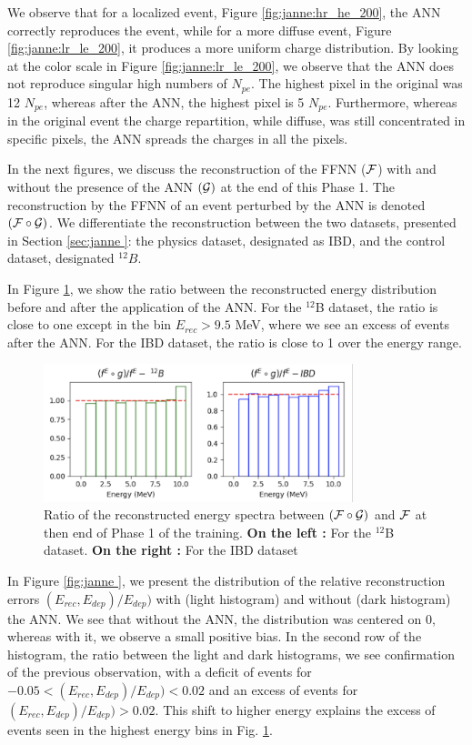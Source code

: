 \documentclass[../main.tex]{subfiles}
\begin{document}
We observe that for a localized event, Figure \ref{fig:janne:hr_he_200}, the ANN correctly reproduces the event, while for a more diffuse event, Figure \ref{fig:janne:lr_le_200}, it produces a more uniform charge distribution. By looking at the color scale in Figure \ref{fig:janne:lr_le_200}, we observe that the ANN does not reproduce singular high numbers of $N_{pe}$. The highest pixel in the original was 12 $N_{pe}$, whereas after the ANN, the highest pixel is 5 $N_{pe}$. Furthermore, whereas in the original event the charge repartition, while diffuse, was still concentrated in specific pixels, the ANN spreads the charges in all the pixels.

In the next figures, we discuss the reconstruction of the FFNN (${\cal F}$) with and without the presence of the ANN $({\cal G})$ at the end of this Phase 1. The reconstruction by the FFNN of an event perturbed by the ANN is denoted $({\cal F} \circ {\cal G})$. We differentiate the reconstruction between the two datasets, presented in Section \ref{sec:janne
}: the physics dataset, designated as IBD, and the control dataset, designated $^{12}B$.

In Figure \ref{fig:janne:f_circ_over_f_200}, we show the ratio between the reconstructed energy distribution before and after the application of the ANN. For the $^{12}$B dataset, the ratio is close to one except in the bin $E_{rec} > 9.5$ MeV, where we see an excess of events after the ANN. For the IBD dataset, the ratio is close to 1 over the energy range.

\begin{figure}[ht]
  \centering
  \includegraphics[height=4cm]{images/janne/f_circ_over_f_200.png}
  \caption{Ratio of the reconstructed energy spectra between $({\cal F} \circ {\cal G})$ and ${\cal F}$ at then end of Phase 1 of the training. \textbf{On the left :} For the $^{12}$B dataset. \textbf{On the right :} For the IBD dataset}
  \label{fig:janne:f_circ_over_f_200}
\end{figure}

In Figure \ref{fig:janne
}, we present the distribution of the relative reconstruction errors $(E_{rec}, E_{dep})/E_{dep})$ with (light histogram) and without (dark histogram) the ANN. We see that without the ANN, the distribution was centered on 0, whereas with it, we observe a small positive bias. In the second row of the histogram, the ratio between the light and dark histograms, we see confirmation of the previous observation, with a deficit of events for $-0.05 < (E_{rec}, E_{dep})/E_{dep}) < 0.02$ and an excess of events for $(E_{rec}, E_{dep})/E_{dep}) > 0.02$. This shift to higher energy explains the excess of events seen in the highest energy bins in Fig. \ref{fig:janne:f_circ_over_f_200}.
\end{document}
